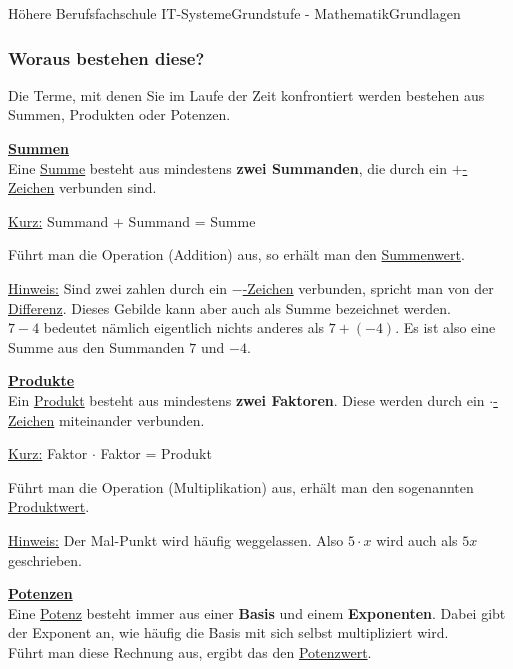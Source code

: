 \documentclass[11pt,twocolumn,oneside,openany,headings=optiontotoc,11pt,numbers=noenddot]{article}
\begin{document}
\begin{worksheet}{Höhere Berufsfachschule IT-Systeme}{Grundstufe - Mathematik}{Grundlagen}
		\subsubsection*{Woraus bestehen diese?}
		Die Terme, mit denen Sie im Laufe der Zeit konfrontiert werden bestehen aus Summen, Produkten oder Potenzen.\\
		\par\noindent
		\textbf{\underline{Summen}}\\
		Eine \underline{Summe} besteht aus mindestens \textbf{zwei Summanden}, die durch ein \underline{\(+\)-Zeichen} verbunden sind.
		\begin{framed}\noindent
			\underline{Kurz:} Summand + Summand = Summe
		\end{framed}
		\noindent
		Führt man die Operation (Addition) aus, so erhält man den \underline{Summenwert}.\\
		\par\noindent
		\underline{Hinweis:} Sind zwei zahlen durch ein \underline{\glqq{}\(-\)\grqq{}-Zeichen} verbunden, spricht man von der \underline{Differenz}. Dieses Gebilde kann aber auch als Summe bezeichnet werden.\\
		\(7-4\) bedeutet nämlich eigentlich nichts anderes als \(7 + (-4)\). Es ist also eine Summe aus den Summanden \(7\) und \(-4\).\\
		\par\noindent
		\textbf{\underline{Produkte}}\\
		Ein \underline{Produkt} besteht aus mindestens \textbf{zwei Faktoren}. Diese werden durch ein \underline{\glqq{}\(\cdot\)\grqq{}-Zeichen} miteinander verbunden.
		\begin{framed}
			\noindent
			\underline{Kurz:} Faktor $\cdot$ Faktor = Produkt
		\end{framed}
		\noindent
		Führt man die Operation (Multiplikation) aus, erhält man den sogenannten \underline{Produktwert}.\\
		\par\noindent
		\underline{Hinweis:} Der Mal-Punkt wird häufig weggelassen. Also \(5\cdot x\) wird auch als \(5x\) geschrieben.\\
		\par\noindent
		\textbf{\underline{Potenzen}}\\
		Eine \underline{Potenz} besteht immer aus einer \textbf{Basis} und einem \textbf{Exponenten}. Dabei gibt der Exponent an, wie häufig die Basis mit sich selbst multipliziert wird.\\
		Führt man diese Rechnung aus, ergibt das den \underline{Potenzwert}.

\end{worksheet}
\end{document}
